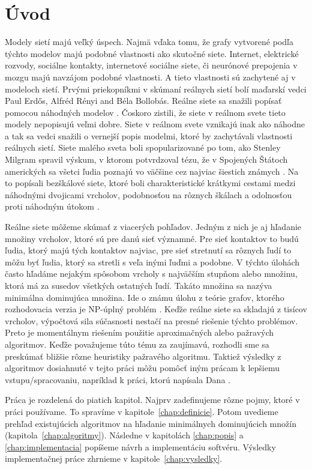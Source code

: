 \cleardoublepage
{}
\chapter*{Úvod}\label{chap:intro}

Modely sietí majú veľký úspech. Najmä vďaka tomu, že grafy vytvorené podľa 
týchto modelov majú podobné vlastnosti ako skutočné siete. Internet, elektrické 
rozvody, sociálne kontakty, internetové sociálne siete, či neurónové prepojenia 
v mozgu majú navzájom podobné vlastnosti. A tieto vlastnosti sú zachytené aj v 
modeloch sietí. Prvými priekopníkmi v skúmaní reálnych sietí bolí maďarskí 
vedci Paul Erdős, Alfréd Rényi and Béla Bollobás. Reálne siete sa snažili 
popísať pomocou náhodných modelov \citep{erdos:rnd}. Čoskoro zistili, že 
siete v reálnom svete tieto modely nepopisujú veľmi dobre. Siete v reálnom 
svete vznikajú inak ako náhodne a tak sa vedci snažili o vernejší popis 
modelmi, ktoré by zachytávali vlastnosti reálnych sietí. Siete malého sveta 
boli spopularizované po tom, ako Stenley Milgram spravil výskum, v ktorom 
potvrdzoval tézu, že v Spojených Štátoch amerických sa všetci 
ľudia poznajú vo väčšine cez najviac šiestich známych \citep{kochen}. Na to 
popísali \citet{barabasi:albert} bezškálové siete, ktoré boli charakteristické 
krátkymi cestami medzi náhodnými dvojicami vrcholov, podobnosťou na rôznych 
škálach a odolnosťou proti náhodným útokom \citep{barabasi:albert:2}.

Reálne siete môžeme skúmať z viacerých pohľadov. Jedným z nich je aj hľadanie 
množiny vrcholov, ktoré sú pre danú sieť významné. Pre sieť kontaktov to budú 
ľudia, ktorý majú tých kontaktov najviac, pre sieť stretnutí sa rôznych ľudí 
to môžu byť ľudia, ktorý sa stretli s veľa inými ľuďmi a podobne. V týchto 
úlohách často hľadáme nejakým spôsobom vrcholy s najväčším stupňom alebo 
množinu, ktorá má za susedov všetkých ostatných ľudí. Takáto množina sa nazýva 
minimálna dominujúca množina. Ide o známu úlohu z teórie grafov, ktorého 
rozhodovacia verzia je NP-úplný problém \citep{npcomp}. Keďže reálne siete sa 
skladajú z tisícov vrcholov, výpočtová sila súčasnosti nestačí na presné 
riešenie týchto problémov. Preto je momentálnym riešením použitie 
aproximačných alebo pažravých algoritmov. Keďže považujeme túto tému za 
zaujímavú, rozhodli sme sa preskúmať bližšie rôzne heuristiky pažravého 
algoritmu. Taktiež výsledky z algoritmov dosiahnuté v tejto práci môžu pomôcť 
iným prácam k lepšiemu vstupu/spracovaniu, napríklad k práci, ktorú napísala 
Dana \citet{sunikova}.

Práca je rozdelená do piatich kapitol. Najprv zadefinujeme rôzne pojmy, ktoré 
v práci používame. To spravíme v kapitole~\ref{chap:definicie}. Potom uvedieme 
prehľad existujúcich algoritmov na hľadanie minimálnych dominujúcich množín 
(kapitola~\ref{chap:algoritmy}). Následne v kapitolách \ref{chap:popis} a 
\ref{chap:implementacia} popíšeme návrh a implementáciu softvéru. Výsledky 
implementačnej práce zhrnieme v kapitole~\ref{chap:vysledky}.




